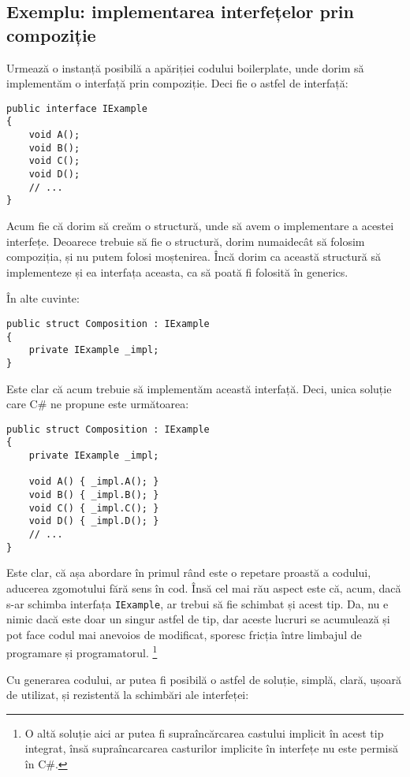 \documentclass[a4paper,12pt]{report}
\begin{document}
\subsection{Exemplu: implementarea interfețelor prin compoziție}

Urmează o instanță posibilă a apăriției codului boilerplate, unde dorim să implementăm o interfață prin compoziție\cite{composition_interface_boilerplate}.
Deci fie o astfel de interfață:

\begin{verbatim}
public interface IExample
{
    void A();
    void B();
    void C();
    void D();
    // ...
}
\end{verbatim}

Acum fie că dorim să creăm o structură, unde să avem o implementare a acestei interfețe.
Deoarece trebuie să fie o structură, dorim numaidecât să folosim compoziția, și nu putem folosi moștenirea.
Încă dorim ca această structură să implementeze și ea interfața aceasta, ca să poată fi folosită în generics.

În alte cuvinte:

\begin{verbatim}
public struct Composition : IExample
{
    private IExample _impl;
}
\end{verbatim}

Este clar că acum trebuie să implementăm această interfață.
Deci, unica soluție care C\# ne propune este următoarea:

\begin{verbatim}
public struct Composition : IExample
{
    private IExample _impl;

    void A() { _impl.A(); }
    void B() { _impl.B(); }
    void C() { _impl.C(); }
    void D() { _impl.D(); }
    // ...
}
\end{verbatim}

Este clar, că așa abordare în primul rând este o repetare proastă a codului, aducerea zgomotului fără sens în cod.
Însă cel mai rău aspect este că, acum, dacă s-ar schimba interfața \texttt{IExample}, ar trebui să fie schimbat și acest tip.
Da, nu e nimic dacă este doar un singur astfel de tip, dar aceste lucruri se acumulează și pot face codul mai anevoios de modificat, sporesc fricția între limbajul de programare și programatorul. \footnote{
  O altă soluție aici ar putea fi supraîncărcarea castului implicit în acest tip integrat,
  însă supraîncarcarea casturilor implicite în interfețe nu este permisă în C\#.
}

Cu generarea codului, ar putea fi posibilă o astfel de soluție, simplă, clară, ușoară de utilizat, și rezistentă la schimbări ale interfeței:
\end{document}
